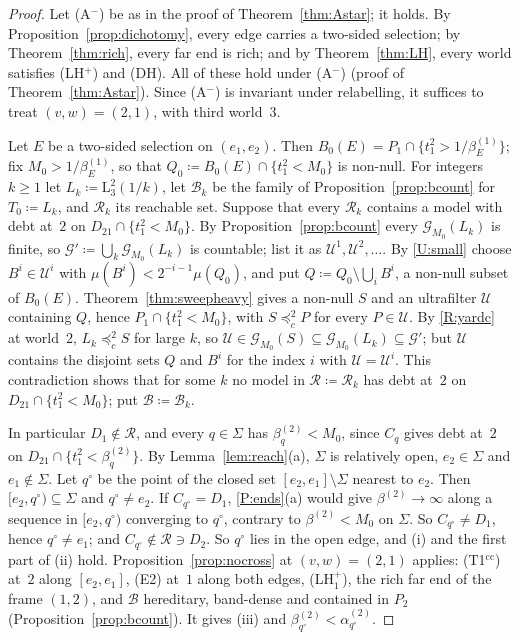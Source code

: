 \documentclass[11pt]{article}
\theoremstyle{definition}\newtheorem{definition}[theorem]{Definition}
\theoremstyle{remark}\newtheorem{remark}[theorem]{Remark}
\newcommand{\Uf}{\mathcal U}
\newcommand{\Bfam}{\mathcal B}
\newcommand{\Lo}[3]{\mathrm L^{#1}_{#2}(#3)}
\newcommand{\Tcc}{\textup{(T1$^{\mathrm{cc}}$)}}
\begin{document}
\begin{proof}
Let (A$^-$) be as in the proof of Theorem~\ref{thm:Astar}; it holds. By
Proposition~\ref{prop:dichotomy}, every edge carries a two-sided selection;
by Theorem~\ref{thm:rich}, every far end is rich; and by
Theorem~\ref{thm:LH}, every world satisfies (LH$^+$) and (DH). All of these
hold under (A$^-$) (proof of Theorem~\ref{thm:Astar}). Since (A$^-$) is
invariant under relabelling, it suffices to treat $(v,w)=(2,1)$, with third
world~$3$.

Let $E$ be a two-sided selection on $(e_1,e_2)$. Then $B_0(E)=P_1\cap
\{t^2_1>1/\beta^{(1)}_E\}$; fix $M_0>1/\beta^{(1)}_E$, so that
$Q_0\coloneqq B_0(E)\cap\{t^2_1<M_0\}$ is non-null. For integers $k\ge1$ let
$L_k\coloneqq\Lo23{1/k}$, let $\Bfam_k$ be the family of
Proposition~\ref{prop:bcount} for $T_0\coloneqq L_k$, and $\mathcal R_k$ its
reachable set. Suppose that every $\mathcal R_k$ contains a model with debt
at~$2$ on $D_{21}\cap\{t^2_1<M_0\}$. By Proposition~\ref{prop:bcount} every
$\mathcal G_{M_0}(L_k)$ is finite, so $\mathcal G'\coloneqq\bigcup_k
\mathcal G_{M_0}(L_k)$ is countable; list it as $\Uf^1,\Uf^2,\dots$. By
\ref{U:small} choose $B^i\in\Uf^i$ with $\mu(B^i)<2^{-i-1}\mu(Q_0)$, and
put $Q\coloneqq Q_0\setminus\bigcup_iB^i$, a non-null subset of $B_0(E)$.
Theorem~\ref{thm:sweepheavy} gives a non-null $S$ and an ultrafilter $\Uf$
containing $Q$, hence $P_1\cap\{t^2_1<M_0\}$, with $S\preceq^2_cP$ for every
$P\in\Uf$. By \ref{R:yardc} at world~$2$, $L_k\preceq^2_cS$ for large $k$,
so $\Uf\in\mathcal G_{M_0}(S)\subseteq\mathcal G_{M_0}(L_k)\subseteq
\mathcal G'$; but $\Uf$ contains the disjoint sets $Q$ and $B^i$ for the
index $i$ with $\Uf=\Uf^i$. This contradiction shows that for some $k$ no
model in $\mathcal R\coloneqq\mathcal R_k$ has debt at~$2$ on
$D_{21}\cap\{t^2_1<M_0\}$; put $\Bfam\coloneqq\Bfam_k$.

In particular $D_1\notin\mathcal R$, and every $q\in\Sigma$ has
$\beta^{(2)}_q<M_0$, since $C_q$ gives debt at~$2$ on $D_{21}\cap\{t^2_1<
\beta^{(2)}_q\}$. By Lemma~\ref{lem:reach}(a), $\Sigma$ is relatively open,
$e_2\in\Sigma$ and $e_1\notin\Sigma$. Let $q^\circ$ be the point of the
closed set $[e_2,e_1]\setminus\Sigma$ nearest to $e_2$. Then
$[e_2,q^\circ)\subseteq\Sigma$ and $q^\circ\ne e_2$. If $C_{q^\circ}=D_1$,
\ref{P:ends}(a) would give $\beta^{(2)}\to\infty$ along a sequence in
$[e_2,q^\circ)$ converging to $q^\circ$, contrary to $\beta^{(2)}<M_0$ on
$\Sigma$. So $C_{q^\circ}\ne D_1$, hence $q^\circ\ne e_1$; and
$C_{q^\circ}\notin\mathcal R\ni D_2$. So $q^\circ$ lies in the open edge, and
(i) and the first part of (ii) hold. Proposition~\ref{prop:nocross} at
$(v,w)=(2,1)$ applies: \Tcc{} at~$2$ along $[e_2,e_1]$, (E2) at~$1$ along
both edges, (LH$^+_1$), the rich far end of the frame $(1,2)$, and $\Bfam$
hereditary, band-dense and contained in $P_2$
(Proposition~\ref{prop:bcount}). It gives (iii) and
$\beta^{(2)}_{q^\circ}<\alpha^{(2)}_{q^\circ}$.


\end{proof}
\end{document}

